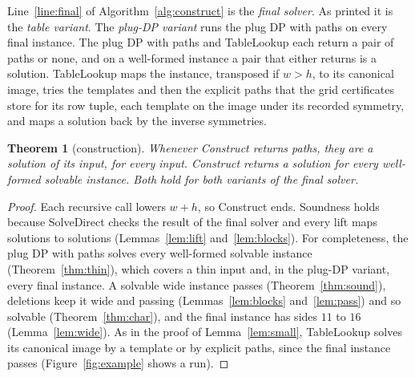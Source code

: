 \documentclass[11pt]{article}
\newtheorem{theorem}{Theorem}
\begin{document}
Line~\ref{line:final} of Algorithm~\ref{alg:construct} is the \emph{final solver}. As printed it is
the \emph{table variant}. The \emph{plug-DP variant} runs the plug DP with paths on every final
instance. The plug DP with paths and TableLookup each return a pair of paths or none, and on a well-formed
instance a pair that either returns is a solution. TableLookup maps the instance, transposed if $w>h$, to its canonical image, tries the
templates and then the explicit paths that the grid certificates store for its row tuple, each
template on the image under its recorded symmetry, and maps a solution back by the inverse
symmetries.

\begin{theorem}[construction]\label{thm:construct}
Whenever Construct returns paths, they are a solution of its input, for every input. Construct
returns a solution for every well-formed solvable instance. Both hold for both variants of the final
solver.
\end{theorem}
\begin{proof}
Each recursive call lowers $w+h$, so Construct ends. Soundness holds because SolveDirect checks the
result of the final solver and every lift maps solutions to solutions
(Lemmas~\ref{lem:lift} and~\ref{lem:blocks}). For completeness, the plug DP with paths solves every
well-formed solvable instance (Theorem~\ref{thm:thin}), which covers a thin input and, in the
plug-DP variant, every final instance. A solvable wide instance passes (Theorem~\ref{thm:sound}),
deletions keep it wide and passing (Lemmas~\ref{lem:blocks} and~\ref{lem:pass}) and so solvable
(Theorem~\ref{thm:char}), and the final instance has sides $11$ to $16$ (Lemma~\ref{lem:wide}). As
in the proof of Lemma~\ref{lem:small}, TableLookup solves its canonical image by a template or by
explicit paths, since the final instance passes (Figure~\ref{fig:example} shows a run).
\end{proof}
\end{document}
